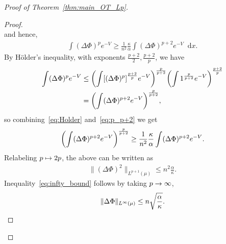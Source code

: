 \documentclass[10pt]{amsart}
\theoremstyle{definition}\newtheorem{defi}[theo]{Definition}\newtheorem{rema}[theo]{Remark}\newtheorem{exam}[theo]{Example}\newtheorem{exem}[theo]{Example}\newtheorem{nota}[theo]{Notation}
\newcommand{\dd}{n}
\newcommand{\source}{\mu}
\newcommand{\lsh}{\alpha}
\newcommand{\lc}{\kappa}
\newcommand*\diff{\mathop{}\!\mathrm{d}}
\newcommand{\OT}{\Phi}
\renewcommand*{\to}{\mathchoice{\longrightarrow}{\rightarrow}{\rightarrow}{\rightarrow}}
\let\oldmapsto\mapsto
\renewcommand*{\mapsto}{\mathchoice{\longmapsto}{\oldmapsto}{\oldmapsto}{\oldmapsto}}
\let\originalleft\left
\let\originalright\right
\renewcommand{\left}{\mathopen{}\mathclose\bgroup\originalleft}
\renewcommand{\right}{\aftergroup\egroup\originalright}
\begin{document}
\begin{proof}[Proof of Theorem~\ref{thm:main_OT_Lp}]
\begin{proof}
\[\]
and hence,
\begin{align}\label{eq:p_p+2}
\int (\Delta \OT)^p e^{-V}\ge\frac{1}{\dd^2} \frac{\lc}{\lsh} \int (\Delta \OT)^{p+2} e^{-V}\diff x.
\end{align}
By H\"older's inequality, with exponents $\frac{p+2}{2},\frac{p+2}{p}$, we have
\begin{equation}\label{eq:Holder}
\begin{aligned}
\int (\Delta \OT)^p e^{-V}&\le \left(\int \left[(\Delta \OT)^p\right]^{\frac{p+2}{p}} e^{-V} \right)^{\frac{p}{p+2}}\left(\int 1^{\frac{p}{p+2}}e^{-V}\right)^{\frac{p+2}{p}}\\
&=\left(\int (\Delta\OT)^{p+2}e^{-V}\right)^{\frac{p}{p+2}},
\end{aligned}
\end{equation}
so combining~\eqref{eq:Holder} and~\eqref{eq:p_p+2} we get
\[
\left(\int (\Delta\OT)^{p+2}e^{-V}\right)^{\frac{p}{p+2}}\ge \frac{1}{\dd^2}\frac{\lc}{\lsh} \int (\Delta \OT)^{p+2} e^{-V}.
\]
Relabeling $p\mapsto 2p$, the above can be written as
\begin{align}\label{eq:q_bound_proof}
\|(\Delta\OT)^2\|_{L^{p+1}(\source)}\le\dd^2 \frac{\lsh}{\lc}.
\end{align}
Inequality~\eqref{eq:infty_bound} follows by taking $p\to\infty$,
\begin{equation}\label{eq:infty_bound_proof}
\|\Delta\OT\|_{L^{\infty}(\source)}\le \dd\sqrt{ \frac{\lsh}{\lc}}.\qedhere
\end{equation}
\end{proof}


\end{proof}
\end{document}
